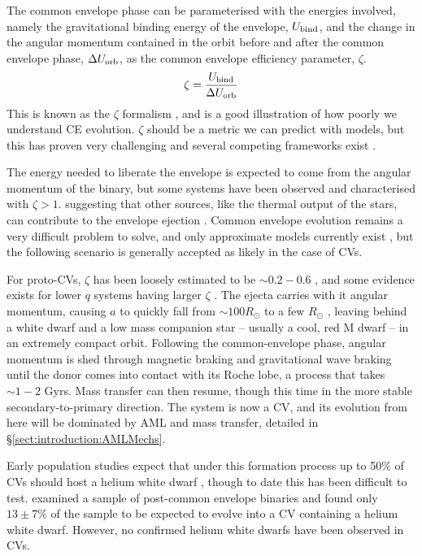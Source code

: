 The common envelope phase can be parameterised with the energies involved, namely the gravitational binding energy of the envelope, $U_{\rm bind}$, and the change in the angular momentum contained in the orbit before and after the common envelope phase, $\Delta U_{\rm orb}$, as the common envelope efficiency parameter, $\zeta$.
\begin{equation}
    \zeta = \frac{U_{\rm bind}}{\Delta U_{\rm orb}}
\end{equation}
This is known as the $\zeta$ formalism \citep{demarco2011}, and is a good illustration of how poorly we understand CE evolution. $\zeta$ should be a metric we can predict with models, but this has proven very challenging and several competing frameworks exist \citep{ivanova2020}. 

The energy needed to liberate the envelope is expected to come from the angular momentum of the binary, but some systems have been observed and characterised with $\zeta > 1$. suggesting that other sources, like the thermal output of the stars, can contribute to the envelope ejection \citep{demarco2011, ivanova2013}. Common envelope evolution remains a very difficult problem to solve, and only approximate models currently exist \citep{ivanova2020}, but the following scenario is generally accepted as likely in the case of CVs.

For proto-CVs, $\zeta$ has been loosely estimated to be $\sim 0.2 - 0.6$ \citep{politano2007}, and some evidence exists for lower $q$ systems having larger $\zeta$ \citep{passy2013}. The ejecta carries with it angular momentum, causing $a$ to quickly fall from $\sim 100 R_\odot$ to a few $R_\odot$ \citep{politano2007}, leaving behind a white dwarf and a low mass companion star -- usually a cool, red M dwarf -- in an extremely compact orbit. 
Following the common-envelope phase, angular momentum is shed through magnetic braking and gravitational wave braking until the donor comes into contact with its Roche lobe, a process that takes $\sim 1-2$ Gyrs. Mass transfer can then resume, though this time in the more stable secondary-to-primary direction. The system is now a CV, and its evolution from here will be dominated by AML and mass transfer, detailed in \S\ref{sect:introduction:AMLMechs}.

Early population studies expect that under this formation process up to 50\% of CVs should host a helium white dwarf \citep{politano1996}, though to date this has been difficult to test. 
\citet{zorotovic2010} examined a sample of post-common envelope binaries and found only $13\pm7\%$ of the sample to be expected to evolve into a CV containing a helium white dwarf. However, no confirmed helium white dwarfs have been observed in CVs.



